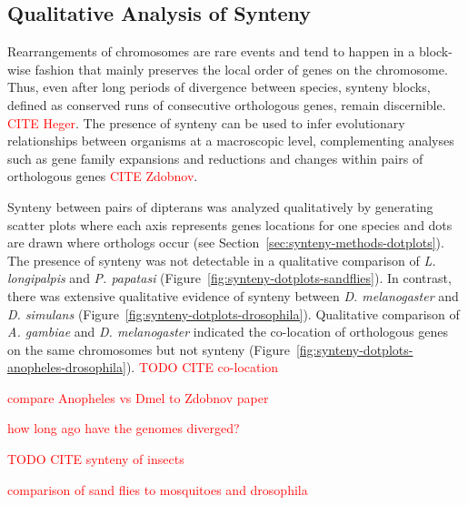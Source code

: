 \subsection{Qualitative Analysis of Synteny}
Rearrangements of chromosomes are rare events and tend to happen in a block-wise fashion that mainly preserves the local order of genes on the chromosome. Thus, even after long periods of divergence between species, synteny blocks, defined as conserved runs of consecutive orthologous genes, remain discernible. \textcolor{red}{CITE Heger}.  The presence of synteny can be used to infer evolutionary relationships between organisms at a macroscopic level, complementing analyses such as gene family expansions and reductions and changes within pairs of orthologous genes \textcolor{red}{CITE Zdobnov}.

Synteny between pairs of dipterans was analyzed qualitatively by generating scatter plots where each axis represents genes locations for one species and dots are drawn where orthologs occur (see Section~\ref{sec:synteny-methods-dotplots}). The presence of synteny was not detectable in a qualitative comparison of \emph{L. longipalpis} and \emph{P. papatasi} (Figure~\ref{fig:synteny-dotplots-sandflies}).  In contrast, there was extensive qualitative evidence of synteny between \emph{D. melanogaster} and \emph{D. simulans} (Figure~\ref{fig:synteny-dotplots-drosophila}).  Qualitative comparison of \emph{A. gambiae} and \emph{D. melanogaster} indicated the co-location of orthologous genes on the same chromosomes but not synteny (Figure~\ref{fig:synteny-dotplots-anopheles-drosophila}). \textcolor{red}{TODO CITE co-location}

\textcolor{red}{compare Anopheles vs Dmel to Zdobnov paper}

\textcolor{red}{how long ago have the genomes diverged?}

\textcolor{red}{TODO CITE synteny of insects}

\textcolor{red}{comparison of sand flies to mosquitoes and drosophila}

